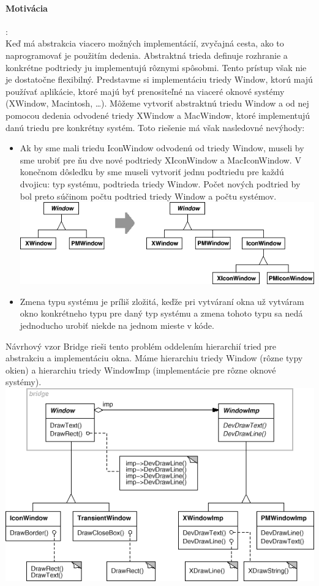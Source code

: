 	\paragraph{Motivácia}:\\
		Keď má abstrakcia viacero možných implementácií, zvyčajná cesta, ako to naprogramovať je použitím dedenia. Abstraktná trieda definuje rozhranie a konkrétne podtriedy ju implementujú rôznymi spôsobmi. Tento prístup však nie je dostatočne flexibilný. Predstavme si implementáciu triedy Window, ktorú majú používať aplikácie, ktoré majú byť prenositeľné na viaceré oknové systémy (XWindow, Macintosh, …). Môžeme vytvoriť abstraktnú triedu Window a od nej pomocou dedenia odvodené triedy XWindow a MacWindow, ktoré implementujú danú triedu pre konkrétny systém. Toto riešenie má však nasledovné nevýhody:
		\begin{itemize}
			\item Ak by sme mali triedu IconWindow odvodenú od triedy Window, museli by sme urobiť pre ňu dve nové podtriedy XIconWindow a MacIconWindow. V konečnom dôsledku by sme museli vytvoriť jednu podtriedu pre každú dvojicu: typ systému, podtrieda triedy Window. Počet nových podtried by bol preto súčinom počtu podtried triedy Window a počtu systémov.\\

			\includegraphics[width=.9\textwidth]{images/programovanie/bridge1}


			\item Zmena typu systému je príliš zložitá, keďže pri vytváraní okna už vytváram okno konkrétneho typu pre daný typ systému a zmena tohoto typu sa nedá jednoducho urobiť niekde na jednom mieste v kóde.
		\end{itemize}
		Návrhový vzor Bridge rieši tento problém oddelením hierarchií tried pre abstrakciu a implementáciu okna. Máme hierarchiu triedy Window (rôzne typy okien) a hierarchiu triedy WindowImp (implementácie pre rôzne oknové systémy).\\

	\includegraphics[width=.9\textwidth]{images/programovanie/bridge2}


